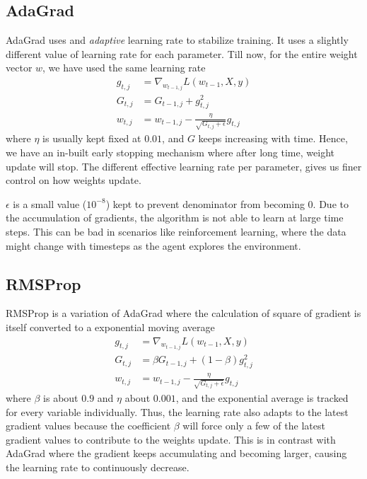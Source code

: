 \documentclass[../../deep_learning_notes.tex]{subfiles}
\begin{document}
\subsection{AdaGrad}
AdaGrad uses and \emph{adaptive} learning rate to stabilize training. It uses a slightly different value of learning rate for each parameter. Till now, for the entire weight vector $w$, we have used the same learning rate
\begin{align*}
    g_{t,j} &= \nabla_{w_{t-1, j}}L(w_{t-1}, X, y)\\
    G_{t,j} &= G_{t-1,j} + g_{t,j}^{2}\\
    w_{t,j} &= w_{t-1,j} - \frac{\eta}{\sqrt{G_{t,j} + \epsilon}} g_{t,j} 
\end{align*}
where $\eta$ is usually kept fixed at $0.01$, and $G$ keeps increasing with time. Hence, we have an in-built early stopping mechanism where after long time, weight update will stop. The different effective learning rate per parameter, gives us finer control on how weights update.\newline

$\epsilon$ is a small value ($10^{-8}$) kept to prevent denominator from becoming $0$. Due to the accumulation of gradients, the algorithm is not able to learn at large time steps. This can be bad in scenarios like reinforcement learning, where the data might change with timesteps as the agent explores the environment.


\subsection{RMSProp}
RMSProp is a variation of AdaGrad where the calculation of square of gradient is itself converted to a exponential moving average
\begin{align*}
    g_{t,j} &= \nabla_{w_{t-1, j}}L(w_{t-1}, X, y)\\
    G_{t,j} &= \beta G_{t-1,j} + (1-\beta)g_{t,j}^{2}\\
    w_{t,j} &= w_{t-1,j} - \frac{\eta}{\sqrt{G_{t,j} + \epsilon}} g_{t,j} 
\end{align*}
where $\beta$ is about $0.9$ and $\eta$ about $0.001$, and the exponential average is tracked for every variable individually. Thus, the learning rate also adapts to the latest gradient values because the coefficient $\beta$ will force only a few of the latest gradient values to contribute to the weights update. This is in contrast with AdaGrad where the gradient keeps accumulating and becoming larger, causing the learning rate to continuously decrease.
\end{document}
